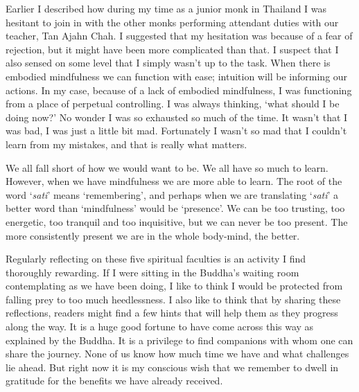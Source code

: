 Earlier I described how during my time as a junior monk in Thailand I
was hesitant to join in with the other monks performing attendant duties
with our teacher, Tan Ajahn Chah. I suggested that my hesitation was
because of a fear of rejection, but it might have been more complicated
than that. I suspect that I also sensed on some level that I simply
wasn't up to the task. When there is embodied mindfulness we can
function with ease; intuition will be informing our actions. In my case,
because of a lack of embodied mindfulness, I was functioning from a
place of perpetual controlling. I was always thinking, `what should I be
doing now?' No wonder I was so exhausted so much of the time. It wasn't
that I was bad, I was just a little bit mad. Fortunately I wasn't so mad
that I couldn't learn from my mistakes, and that is really what matters.

We all fall short of how we would want to be. We all have so much to
learn. However, when we have mindfulness we are more able to learn. The
root of the word `\emph{sati}' means `remembering', and perhaps when we
are translating `\emph{sati}' a better word than `mindfulness' would be
`presence'. We can be too trusting, too energetic, too tranquil and too
inquisitive, but we can never be too present. The more consistently
present we are in the whole body-mind, the better.

\sectionBreak

Regularly reflecting on these five spiritual faculties is an activity I
find thoroughly rewarding. If I were sitting in the Buddha's waiting
room contemplating as we have been doing, I like to think I would be
protected from falling prey to too much heedlessness. I also like to
think that by sharing these reflections, readers might find a few hints
that will help them as they progress along the way. It is a huge good
fortune to have come across this way as explained by the Buddha. It is a
privilege to find companions with whom one can share the journey. None
of us know how much time we have and what challenges lie ahead. But
right now it is my conscious wish that we remember to dwell in gratitude
for the benefits we have already received.

